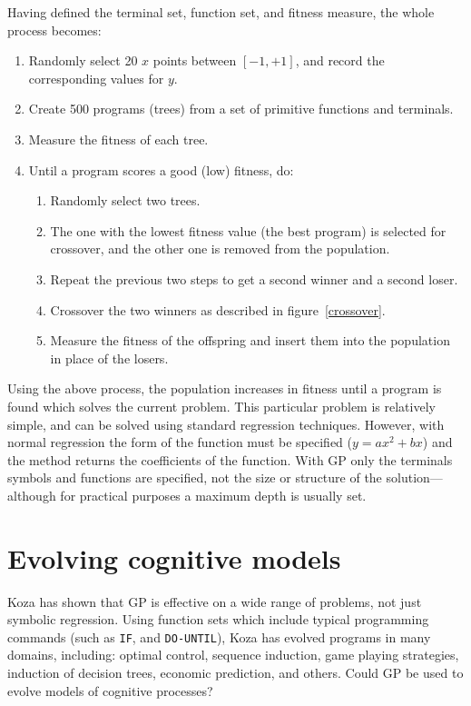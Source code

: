 Having defined the terminal set, function set, and fitness measure, the
whole process becomes:

\begin{enumerate}
\item Randomly select 20 $x$ points between $[-1,+1]$, and record the
corresponding values for $y$.
\item Create 500 programs (trees) from a set of primitive functions and
terminals.
\item Measure the fitness of each tree.
\item Until a program scores a good (low) fitness, do:
\begin{enumerate}
\item Randomly select two trees.
\item The one with the lowest fitness value (the best program) is selected
for crossover, and the other one is removed from the population.
\item Repeat the previous two steps to get a second winner and a
second loser.
\item Crossover the two winners as described in figure~\ref{crossover}.
\item Measure the fitness of the offspring and insert them into the
population in place of the losers.
\end{enumerate}
\end{enumerate}

Using the above process, the population increases in fitness until a
program is found which solves the current problem.  This particular problem
is relatively simple, and can be solved using standard regression
techniques. However, with normal regression the form of the function must
be specified ($y=ax^2+bx$) and the method returns the coefficients of the
function. With GP only
the terminals symbols and functions are specified, not
the size or structure of the solution---although for practical purposes a
maximum depth is usually set.

\section*{Evolving cognitive models}

Koza has shown that GP is effective on a wide range of problems, not just
symbolic regression.  Using function sets which include typical
programming commands (such as \verb|IF|, and \verb|DO-UNTIL|), Koza has
evolved programs in many domains, including: optimal control, sequence
induction,
game playing strategies, induction of decision trees, economic prediction,
and others.  Could GP be used to evolve models of cognitive processes?

